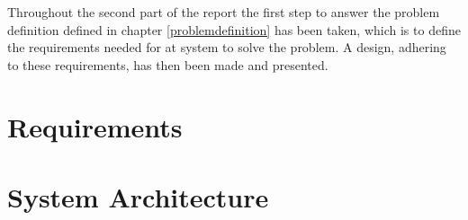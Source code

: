 
Throughout the second part of the report the first step to answer the problem definition defined in chapter \ref{problemdefinition} has been taken, which is to define the requirements needed for at system to solve the problem. A design, adhering to these requirements, has then been made and presented.


\chapter{Requirements}

\chapter{System Architecture}

